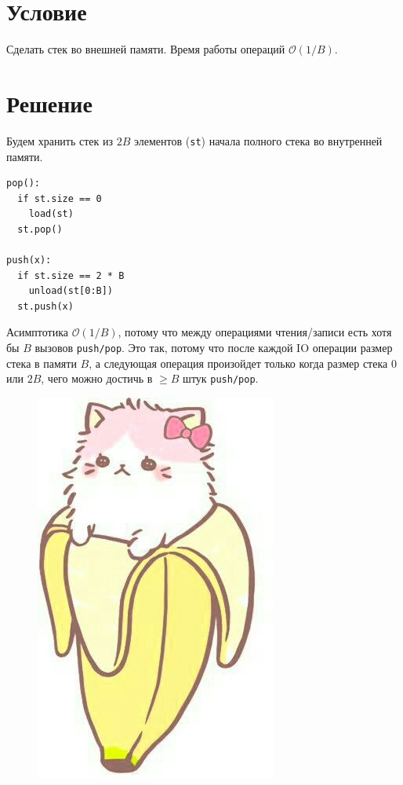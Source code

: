 \documentclass[12pt, a4paper]{article}
\begin{document}
\section*{Условие}

Сделать стек во внешней памяти. Время работы операций $\mathcal O(1/B)$.

\section*{Решение}

Будем хранить стек из $2B$ элементов (\texttt{st}) начала полного стека во внутренней памяти.

\begin{lstlisting}
pop():
  if st.size == 0
    load(st)
  st.pop()

push(x):
  if st.size == 2 * B
    unload(st[0:B])
  st.push(x)
\end{lstlisting}

Асимптотика $\mathcal O(1/B)$, потому что между операциями чтения/записи есть хотя бы $B$ вызовов \texttt{push/pop}. Это так, потому что после каждой IO операции размер стека в памяти $B$, а следующая операция произойдет только когда размер стека $0$ или $2B$, чего можно достичь в $\ge B$ штук \texttt{push/pop}.

\begin{figure}[b]
  \includegraphics[scale=0.4]{cat.jpg}
  \centering
\end{figure}
\end{document}
